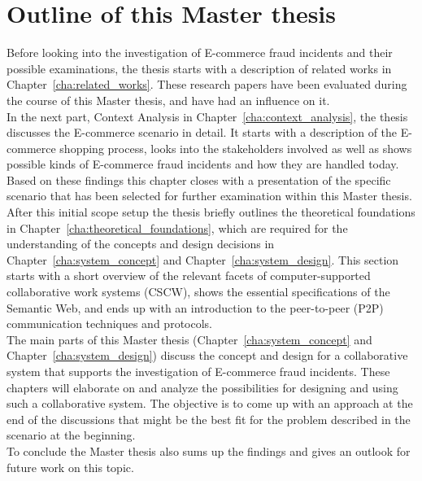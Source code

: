 
\section{Outline of this Master thesis}
\label{sec:thesis_outline}

Before looking into the investigation of \gls{E-commerce} fraud incidents and their possible examinations, the thesis starts with a description of related works in Chapter~\ref{cha:related_works}. These research papers have been evaluated during the course of this Master thesis, and have had an influence on it. \\

In the next part, Context Analysis in Chapter~\ref{cha:context_analysis}, the thesis discusses the \gls{E-commerce} scenario in detail. It starts with a description of the \gls{E-commerce} shopping process, looks into the stakeholders involved as well as shows possible kinds of \gls{E-commerce} fraud incidents and how they are handled today. Based on these findings this chapter closes with a presentation of the specific scenario that has been selected for further examination within this Master thesis. \\

After this initial scope setup the thesis briefly outlines the theoretical foundations in Chapter~\ref{cha:theoretical_foundations}, which are required for the understanding of the concepts and design decisions in Chapter~\ref{cha:system_concept} and Chapter~\ref{cha:system_design}. This section starts with a short overview of the relevant facets of computer-supported collaborative work systems (\gls{CSCW}), shows the essential specifications of the Semantic Web, and ends up with an introduction to the peer-to-peer (\gls{P2P}) communication techniques and protocols. \\

The main parts of this Master thesis (Chapter~\ref{cha:system_concept} and Chapter~\ref{cha:system_design}) discuss the concept and design for a collaborative system that supports the investigation of \gls{E-commerce} fraud incidents. These chapters will elaborate on and analyze the possibilities for designing and using such a collaborative system. The objective is to come up with an approach at the end of the discussions that might be the best fit for the problem described in the scenario at the beginning. \\

To conclude the Master thesis also sums up the findings and gives an outlook for future work on this topic.

